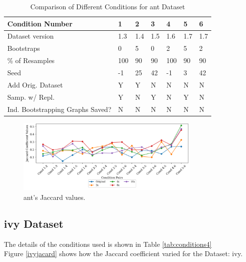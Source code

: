 \documentclass[sigconf,review,anonymous,nonacm=true]{acmart}
\begin{document}
\begin{table}[h]
\centering
\caption{Comparison of Different Conditions for ant Dataset}
\label{tab:conditions3}
\begin{tabularx}{0.5\textwidth}{|l|X|X|X|X|X|X|}
\hline
\textbf{Condition Number}        & \textbf{1} & \textbf{2} & \textbf{3} & \textbf{4} & \textbf{5} & \textbf{6} \\ \hline
Dataset version                  & 1.3          & 1.4          & 1.5          & 1.6          & 1.7          & 1.7          \\ \hline
Bootstraps                & 0                & 5                & 0                & 2                & 5                & 2                \\ \hline
\% of Resamples           & 100            & 90            & 90            & 100            & 90            & 90            \\ \hline
Seed                      & -1          & 25               & 42               & -1          & 3                & 42               \\ \hline
Add Orig. Dataset         & Y                & Y                & N                & N                & N                & N                \\ \hline
Samp. w/ Repl.            & Y                & N                & Y                & N                & Y                & N                \\ \hline
Ind. Bootstrapping Graphs Saved?         & N                & N                & N                & N                & N                & N                \\ \hline
\end{tabularx}
\end{table}

\begin{figure}[h]
\caption{ant's Jaccard values.}\label{antjacard}
\includegraphics[width=9cm]{images/ant.png}
\end{figure}

\subsection{ivy Dataset}
The details of the conditions used is shown in Table \ref{tab:conditions4}\\
Figure \ref{ivyjacard} shows how the Jaccard coefficient varied for the Dataset: ivy. 
\end{document}
